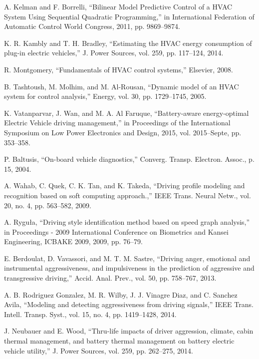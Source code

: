 
A. Kelman and F. Borrelli, “Bilinear Model Predictive Control of a HVAC System Using Sequential Quadratic Programming,” in International Federation of Automatic Control World Congress, 2011, pp. 9869–9874.

K. R. Kambly and T. H. Bradley, “Estimating the HVAC energy consumption of plug-in electric vehicles,” J. Power Sources, vol. 259, pp. 117–124, 2014.

R. Montgomery, “Fundamentals of HVAC control systems,” Elsevier, 2008.

B. Tashtoush, M. Molhim, and M. Al-Rousan, “Dynamic model of an HVAC system for control analysis,” Energy, vol. 30, pp. 1729–1745, 2005.

K. Vatanparvar, J. Wan, and M. A. Al Faruque, “Battery-aware energy-optimal Electric Vehicle driving management,” in Proceedings of the International Symposium on Low Power Electronics and Design, 2015, vol. 2015–Septe, pp. 353–358.

P. Baltusis, “On-board vehicle diagnostics,” Converg. Transp. Electron. Assoc., p. 15, 2004.

A. Wahab, C. Quek, C. K. Tan, and K. Takeda, “Driving profile modeling and recognition based on soft computing approach.,” IEEE Trans. Neural Netw., vol. 20, no. 4, pp. 563–582, 2009.

A. Ryguła, “Driving style identification method based on speed graph analysis,” in Proceedings - 2009 International Conference on Biometrics and Kansei Engineering, ICBAKE 2009, 2009, pp. 76–79.

E. Berdoulat, D. Vavassori, and M. T. M. Sastre, “Driving anger, emotional and instrumental aggressiveness, and impulsiveness in the prediction of aggressive and transgressive driving,” Accid. Anal. Prev., vol. 50, pp. 758–767, 2013.

A. B. Rodriguez Gonzalez, M. R. Wilby, J. J. Vinagre Diaz, and C. Sanchez Avila, “Modeling and detecting aggressiveness from driving signals,” IEEE Trans. Intell. Transp. Syst., vol. 15, no. 4, pp. 1419–1428, 2014.

J. Neubauer and E. Wood, “Thru-life impacts of driver aggression, climate, cabin thermal management, and battery thermal management on battery electric vehicle utility,” J. Power Sources, vol. 259, pp. 262–275, 2014.

